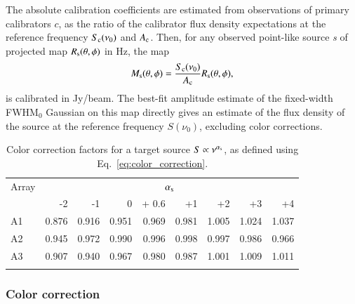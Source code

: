 The absolute calibration coefficients are estimated from observations
of primary calibrators $c$, as the ratio of
the calibrator flux density expectations at the reference frequency
$S_{\rm{c}}(\nu_0)$ and $A_{\rm{c}}$. Then, for any observed point-like source
{\sl s} of projected map $R_{\rm{s}}(\theta,\phi)$ in Hz, the map
\begin{equation}
  M_{\rm{s}}(\theta, \phi) = \frac{S_{\rm{c}} (\nu_{0})}{A_{\rm{c}}}
  R_{\rm{s}}(\theta,\phi),
  \label{eq:pointsourcephot}
\end{equation}
is calibrated in Jy/beam. {\lp The best-fit amplitude estimate
of the fixed-width FWHM$_{0}$ Gaussian on this map directly gives an
estimate of the flux density of the source at the reference
frequency $S(\nu_{0})$, excluding color corrections.}

\begin{table}[!thbp]
\caption{Color correction factors for a target source  $S \propto \nu^{\alpha_{\rm{s}}}$, as defined using Eq.~\ref{eq:color_correction}.}
\label{tab:mod}
\centering 
\begin{tabular}{lrrrrrrrr}
\hline\hline
\noalign{\smallskip}
Array     & \multicolumn{8}{c}{$\alpha_{\rm{s}}$} \\
\noalign{\smallskip}
\hline
\noalign{\smallskip}
         &  -2 &  -1    &    0  & + 0.6 & +1  &  +2  & +3 & +4  \\       
\noalign{\smallskip}
\hline
\noalign{\smallskip}
          A1   & 0.876  &  0.916   &   0.951  & 0.969 &  0.981   &  1.005  &    1.024  &  1.037   \\
          A2   & 0.945  &  0.972   &   0.990  & 0.996 &  0.998   &  0.997  &    0.986  &  0.966      \\ 
          A3   & 0.907  &  0.940   &   0.967  & 0.980 &  0.987   &  1.001  &    1.009  &  1.011     \\
            \noalign{\smallskip}
            \hline
\end{tabular}
\end{table}

\subsubsection{Color correction}

